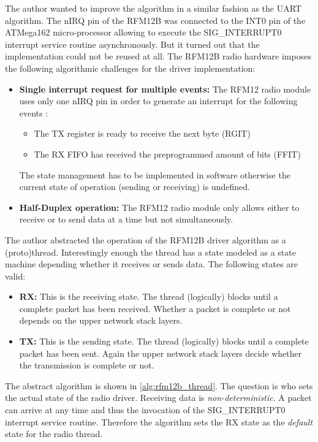 The author wanted to improve the algorithm in a similar fashion as the UART algorithm. The nIRQ pin of the RFM12B was connected to the INT0 pin of the ATMega162 micro-processor allowing to execute the SIG\_INTERRUPT0 interrupt service routine asynchronously. But it turned out that the implementation could not be reused at all. The RFM12B radio hardware imposes the following algorithmic challenges for the driver implementation:
\begin{itemize}
\item \textbf{Single interrupt request for multiple events:} The RFM12 radio module uses only one nIRQ pin in order to generate an interrupt for the following events \cite{sis4221_datasheet}:
\begin{itemize}
\item The TX register is ready to receive the next byte (RGIT)
\item The RX FIFO has received the preprogrammed amount of bits (FFIT)
\end{itemize}
The state management has to be implemented in software otherwise the current state of operation (sending or receiving) is undefined.
\item \textbf{Half-Duplex operation:} The RFM12 radio module only allows either to receive or to send data at a time but not simultaneously.
\end{itemize}

The author abstracted the operation of the RFM12B driver algorithm as a (proto)thread. Interestingly enough the thread has a state modeled as a state machine depending whether it receives or sends data. The following states are valid:

\begin{itemize}
\item \textbf{RX:} This is the receiving state. The thread (logically) blocks until a complete packet has been received. Whether a packet is complete or not depends on the upper network stack layers.
\item \textbf{TX:} This is the sending state. The thread (logically) blocks until a complete packet has been sent. Again the upper network stack layers decide whether the transmission is complete or not.
\end{itemize}

The abstract algorithm is shown in \ref{alg:rfm12b_thread}. The question is who sets the actual state of the radio driver. Receiving data is \emph{non-deterministic}. A packet can arrive at any time and thus the invocation of the SIG\_INTERRUPT0 interrupt service routine. Therefore the algorithm sets the RX state as the \emph{default} state for the radio thread.

